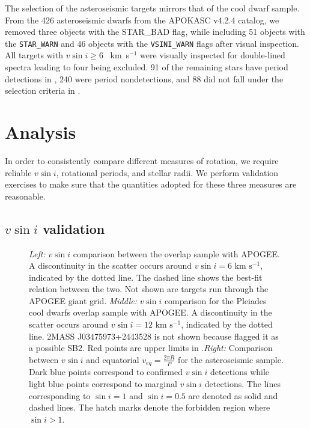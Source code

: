\documentclass[manuscript]{aastex6}
\newcommand{\vsini}{\ensuremath{v \sin i}}
\newcommand{\kms}{\textrm{~km~s}\ensuremath{^{-1}}}
\newcommand{\STARWARN}{\texttt{STAR\_WARN}}
\newcommand{\VSINIWARN}{\texttt{VSINI\_WARN}}
\begin{document}
The selection of the asteroseismic targets mirrors that of the cool dwarf
sample. From the 426 asteroseismic dwarfs from the APOKASC v4.2.4 catalog, we 
removed three objects with the STAR\_BAD flag, while including 51 objects with 
the \STARWARN{} and 46 objects with the \VSINIWARN{} flags after visual 
inspection. All targets with \(\vsini \ge 6\) \kms{} were visually
inspected for double-lined spectra leading to four being excluded. 91 of 
the remaining stars have period detections in \citet{McQuillan14}, 240 were 
period nondetections, and 88 did not fall under the selection criteria in 
\citet{McQuillan14}. 

\section{Analysis}
\label{sec:analysis}

In order to consistently compare different measures of rotation, we require 
reliable \vsini{}, rotational periods, and stellar radii. We perform validation
exercises to make sure that the quantities adopted for these three measures are 
reasonable.


\subsection{\vsini{} validation}
\label{sec:vsini_check}

\begin{figure*}
    \caption{\emph{Left:} \vsini{} comparison between the \citet{Bruntt12}
        overlap sample with APOGEE\@. A discontinuity in the scatter occurs
        around \(\vsini = 6 \kms\), indicated by the dotted line. The dashed
    line shows the best-fit relation between the two. Not shown are targets 
    run through the APOGEE giant grid. \emph{Middle:} \vsini{} comparison for 
    the Pleiades cool dwarfs \citep{Stauffer87} overlap sample with APOGEE\@. 
    A discontinuity in the scatter occurs around \(\vsini = 12 \kms\), 
    indicated by the dotted line. 2MASS J03475973+2443528 is not shown
    because \citet{Stauffer87} flagged it as a possible SB2. Red points are 
    upper limits in \citet{Stauffer87}.\emph{Right:} Comparison between
    \vsini{} and equatorial \(v_{eq} = \frac{2\pi R}{P}\) for the 
    asteroseismic sample. Dark blue points correspond to confirmed
    \vsini{} detections while light blue points correspond to marginal
    \vsini{} detections. The lines corresponding to \(\sin i = 1\) and
    \(\sin i = 0.5\) are denoted as solid and dashed lines. The hatch
    marks denote the forbidden region where \(\sin i > 1\).\label{fig:comps}}
\end{figure*}
\end{document}
